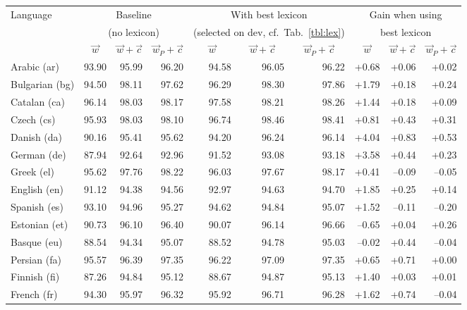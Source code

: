 \documentclass[11pt,a4paper]{article}
\begin{document}
\begin{table}[t]
\centering\scriptsize
\begin{tabular}{l|rrr|rrr|rrr}
\toprule
Language & \multicolumn{3}{c}{Baseline} & \multicolumn{3}{c}{With best lexicon} & \multicolumn{3}{c}{Gain when using} \\
 & \multicolumn{3}{c}{(no lexicon)} & \multicolumn{3}{c}{(selected on dev, cf.~Tab.~\ref{tbl:lex})} & \multicolumn{3}{c}{best lexicon} \\
 & \multicolumn{1}{c}{$\vec{w}$} & \multicolumn{1}{c}{$\vec{w}+\vec{c}$} & \multicolumn{1}{c}{$\vec{w}_P+\vec{c}$} & \multicolumn{1}{c}{$\vec{w}$} & \multicolumn{1}{c}{$\vec{w}+\vec{c}$} & \multicolumn{1}{c}{$\vec{w}_P+\vec{c}$} & \multicolumn{1}{c}{$\vec{w}$} & \multicolumn{1}{c}{$\vec{w}+\vec{c}$} & \multicolumn{1}{c}{$\vec{w}_P+\vec{c}$} \\
\midrule
Arabic (ar) & 93.90 & 95.99 & 96.20 & 94.58 & 96.05 & 96.22 & +0.68 & +0.06 & +0.02\\
Bulgarian (bg) & 94.50 & 98.11 & 97.62 & 96.29 & 98.30 & 97.86 & +1.79 & +0.18 & +0.24\\
Catalan (ca) & 96.14 & 98.03 & 98.17 & 97.58 & 98.21 & 98.26 & +1.44 & +0.18 & +0.09\\
Czech (cs) & 95.93 & 98.03 & 98.10 & 96.74 & 98.46 & 98.41 & +0.81 & +0.43 & +0.31\\
Danish (da) & 90.16 & 95.41 & 95.62 & 94.20 & 96.24 & 96.14 & +4.04 & +0.83 & +0.53\\
German (de) & 87.94 & 92.64 & 92.96 & 91.52 & 93.08 & 93.18 & +3.58 & +0.44 & +0.23\\
Greek (el) & 95.62 & 97.76 & 98.22 & 96.03 & 97.67 & 98.17 & +0.41 & --0.09 & --0.05\\
English (en) & 91.12 & 94.38 & 94.56 & 92.97 & 94.63 & 94.70 & +1.85 & +0.25 & +0.14\\
Spanish (es) & 93.10 & 94.96 & 95.27 & 94.62 & 94.84 & 95.07 & +1.52 & --0.11 & --0.20\\
Estonian (et) & 90.73 & 96.10 & 96.40 & 90.07 & 96.14 & 96.66 & --0.65 & +0.04 & +0.26\\
Basque (eu) & 88.54 & 94.34 & 95.07 & 88.52 & 94.78 & 95.03 & --0.02 & +0.44 & --0.04\\
Persian (fa) & 95.57 & 96.39 & 97.35 & 96.22 & 97.09 & 97.35 & +0.65 & +0.71 & +0.00\\
Finnish (fi) & 87.26 & 94.84 & 95.12 & 88.67 & 94.87 & 95.13 & +1.40 & +0.03 & +0.01\\
French (fr) & 94.30 & 95.97 & 96.32 & 95.92 & 96.71 & 96.28 & +1.62 & +0.74 & --0.04\\

\end{tabular}
\end{table}
\end{document}
